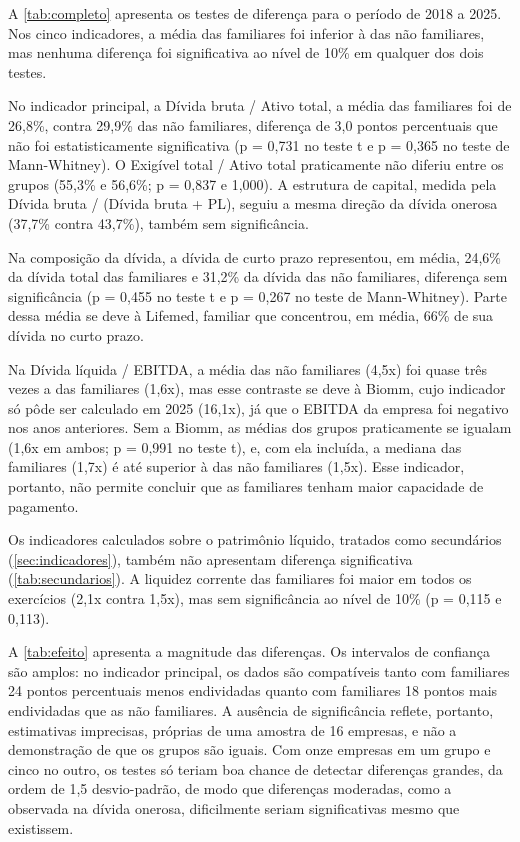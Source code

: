 A \autoref{tab:completo} apresenta os testes de diferença para o período de 2018 a
2025. Nos cinco indicadores, a média das familiares foi inferior à das não
familiares, mas nenhuma diferença foi significativa ao nível de 10\% em qualquer
dos dois testes.



No indicador principal, a Dívida bruta / Ativo total, a média das familiares foi
de 26,8\%, contra 29,9\% das não familiares, diferença de 3,0 pontos percentuais que
não foi estatisticamente significativa (p = 0,731 no teste t e p = 0,365 no teste
de Mann-Whitney). O Exigível total / Ativo total praticamente não diferiu entre os
grupos (55,3\% e 56,6\%; p = 0,837 e 1,000). A estrutura de capital, medida pela
Dívida bruta / (Dívida bruta + PL), seguiu a mesma direção da dívida onerosa
(37,7\% contra 43,7\%), também sem significância.

Na composição da dívida, a dívida de curto prazo representou, em média, 24,6\% da
dívida total das familiares e 31,2\% da dívida das não familiares, diferença sem
significância (p = 0,455 no teste t e p = 0,267 no teste de Mann-Whitney). Parte
dessa média se deve à Lifemed, familiar que concentrou, em média, 66\% de sua
dívida no curto prazo.

Na Dívida líquida / EBITDA, a média das não familiares (4,5x) foi quase três vezes a
das familiares (1,6x), mas esse contraste se deve à Biomm, cujo indicador só pôde
ser calculado em 2025 (16,1x), já que o EBITDA da empresa foi negativo nos anos
anteriores. Sem a Biomm, as médias dos grupos praticamente se igualam (1,6x em
ambos; p = 0,991 no teste t), e, com ela incluída, a mediana das familiares (1,7x)
é até superior à das não familiares (1,5x). Esse indicador, portanto, não permite
concluir que as familiares tenham maior capacidade de pagamento.

Os indicadores calculados sobre o patrimônio líquido, tratados como secundários
(\autoref{sec:indicadores}), também não apresentam diferença significativa
(\autoref{tab:secundarios}). A liquidez corrente das familiares foi maior em todos
os exercícios (2,1x contra 1,5x), mas sem significância ao nível de 10\% (p = 0,115
e 0,113).



A \autoref{tab:efeito} apresenta a magnitude das diferenças. Os intervalos de
confiança são amplos: no indicador principal, os dados são compatíveis tanto com
familiares 24 pontos percentuais menos endividadas quanto com familiares 18 pontos
mais endividadas que as não familiares. A ausência de significância reflete,
portanto, estimativas imprecisas, próprias de uma amostra de 16 empresas, e não a
demonstração de que os grupos são iguais. Com onze empresas em um grupo e cinco no
outro, os testes só teriam boa chance de detectar diferenças grandes, da ordem de
1,5 desvio-padrão, de modo que diferenças moderadas, como a observada na dívida
onerosa, dificilmente seriam significativas mesmo que existissem.

